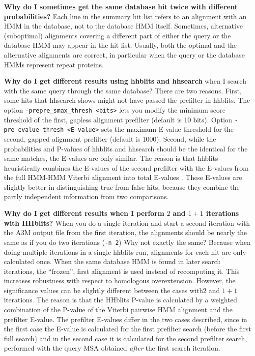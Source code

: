 \documentclass[11pt,a4paper]{article}
\begin{document}
{\bf Why do I sometimes get the same database hit twice with different probabilities?} Each line in the summary hit list refers to an alignment with an HMM in the database, not to the database HMM itself. Sometimes, alternative (suboptimal) alignments covering a different part of either the query or the database HMM may appear in the hit list. Usually, both the optimal and the alternative alignments are correct, in particular when the query or the database HMMs represent repeat proteins. 

{\bf Why do I get different results using hhblits and hhsearch} when I search with the same query through the same database? There are two reasons. First, some hits that hhsearch shows might not have passed the prefilter in hhblits. The option \verb`-prepre_smax_thresh <bits>` lets you modify the minimum score threshold of the first, gapless alignment prefilter (default is 10 bits). Option \verb`-pre_evalue_thresh <E-value>` sets the maximum E-value threshold for the second, gapped alignment prefilter (default is 1000). Second, while the probabilities and P-values of hhblits and hhsearch should be the identical for the same matches, the E-values are only similar. The reason is that hhblits heuristically combines the E-values of the second prefilter with the E-values from the full HMM-HMM Viterbi alignment into total E-values \cite{Remmert:2011}. These E-values are slightly better in distinguishing true from false hits, because they combine the partly independent information from two comparisons.

{\label{2_vs_1+1} \bf Why do I get different results when I perform $2$ and $1+1$ iterations with HHblits?} When you do a single iteration and start a second iteration with the A3M output file from the first iteration, the alignments should be nearly the same as if you do two iterations (\verb`-n 2`) Why not exactly the same? Because when doing multiple iterations in a single hhblits run, alignments for each hit are only calculated once. When the same database HMM is found in later search iterations, the ``frozen'', first alignment is used instead of recomputing it. This increases robustness with respect to homologous overextension. However, the significance values can be slightly different between the cases with$2$ and $1+1$ iterations. The reason is that the HHblits P-value is calculated by a weighted combination of the P-value of the Viterbi pairwise HMM alignment and the prefilter E-value. The prefilter E-values differ in the two cases described, since in the first case the E-value is calculated for the first prefilter search (before the first full search) and in the second case it is calculated for the second prefilter search, performed with the query MSA obtained \emph{after} the first search iteration. 
\end{document}
